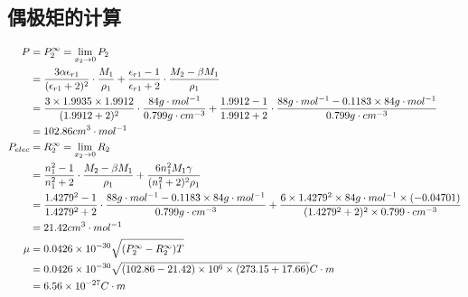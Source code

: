 \documentclass[a4paper]{article}
\begin{document}
\subsection{偶极矩的计算}
\begin{equation}
	\centering
	\begin{aligned}
		P &= P_{2}^{\infty} = \lim\limits_{x_{2}\to 0} P_{2}\\
	  &=\frac{3\alpha\epsilon_{r1}}{(\epsilon_{r1}+2)^{2}}\cdot \frac{M_{1}}{\rho_{1}}
		+ \frac{\epsilon_{r1}-1}{\epsilon_{r1}+2}\cdot \frac{M_{2}-\beta M_{1}}{\rho_{1}}\\
		&=\frac{3\times 1.9935\times 1.9912}{(1.9912+2)^{2}}\cdot \frac{84g\cdot mol^{-1}}{0.799g \cdot cm^{-3}}
		+ \frac{1.9912-1}{1.9912+2}\cdot \frac{88g\cdot mol^{-1}-0.1183\times 84g\cdot mol^{-1}}{0.799g \cdot cm^{-3}}\\
		&=102.86cm^{3}\cdot mol^{-1}\\
	P_{elec} &= R_{2}^{\infty} = \lim\limits_{x_{2}\to 0}R_{2}\\
			 &=\frac{n_{1}^{2}-1}{n_{1}^{2}+2}\cdot \frac{M_{2}-\beta M_{1}}{\rho_{1}}
			 +\frac{6n_{1}^{2}M_{1}\gamma}{(n_{1}^{2}+2)^{2}\rho_{1}}\\
			 &=\frac{1.4279^{2}-1}{1.4279^{2}+2}\cdot \frac{88g\cdot mol^{-1}-0.1183\times 84g\cdot mol^{-1}}{0.799g \cdot cm^{-3}}
			 +\frac{6\times 1.4279^{2}\times 84g\cdot mol^{-1}\times (-0.04701)}{(1.4279^{2}+2)^{2}\times 0.799\cdot cm^{-3}}\\
			 &=21.42cm^{3}\cdot mol^{-1}\\
			 \mu &= 0.0426\times 10^{-30} \sqrt{(P_{2}^{\infty} - R_{2}^{\infty})T}\\
			 &=0.0426\times 10^{-30} \sqrt{(102.86-21.42)\times 10^{6}\times (273.15+17.66)} C\cdot m\\
			 &=6.56\times 10^{-27} C\cdot m\\
	\end{aligned}
\end{equation}

					
\newpage
\end{document}
